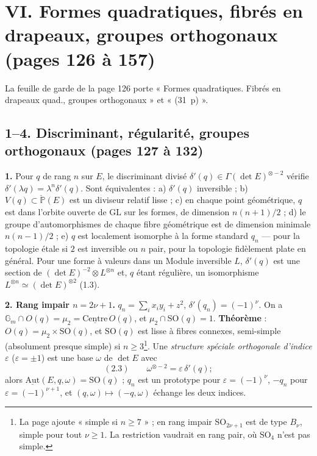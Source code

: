 \documentclass[11pt,a4paper]{article}
\begin{document}
\section*{VI. Formes quadratiques, fibrés en drapeaux, groupes orthogonaux (pages 126 à 157)}

La feuille de garde de la page 126 porte « Formes quadratiques. Fibrés en drapeaux
quad., groupes orthogonaux » et « (31~p) ».

\subsection*{1--4. Discriminant, régularité, groupes orthogonaux (pages 127 à 132)}

\textbf{1.} Pour $q$ de rang $n$ sur $E$, le discriminant divisé $\delta'(q) \in
\Gamma(\det E)^{\otimes -2}$ vérifie $\delta'(\lambda q) = \lambda^n\delta'(q)$. Sont
équivalentes : a) $\delta'(q)$ inversible ; b) $V(q) \subset \check{\mathbb{P}}(E)$ est
un diviseur relatif lisse ; c) en chaque point géométrique, $q$ est dans l'orbite
ouverte de $\mathrm{GL}$ sur les formes, de dimension $n(n+1)/2$ ; d) le groupe
d'automorphismes de chaque fibre géométrique est de dimension minimale $n(n-1)/2$ ;
e) $q$ est localement isomorphe à la forme standard $q_n$ — pour la topologie
étale si $2$ est inversible ou $n$ pair, pour la topologie fidèlement plate en
général. Pour une forme à valeurs dans un Module inversible $L$, $\delta'(q)$ est une
section de $(\det E)^{-2} \otimes L^{\otimes n}$ et, $q$ étant régulière, un
isomorphisme $L^{\otimes n} \simeq (\det E)^{\otimes 2}$ (1.3).

\textbf{2. Rang impair $n = 2\nu + 1$.} $q_n = \sum_{i} x_iy_i + z^2$,
$\delta'(q_n) = (-1)^\nu$. On a $\mathbb{G}_m \cap O(q) = \mu_2 =
\underline{\mathrm{Centre}}\,O(q)$, et $\mu_2 \cap \mathrm{SO}(q) = 1$.
\textbf{Théorème} : $O(q) = \mu_2 \times \mathrm{SO}(q)$, et $\mathrm{SO}(q)$ est lisse à
fibres connexes, semi-simple (absolument presque simple) si $n \geq 3$\footnote{La
page ajoute « simple si $n \geq 7$ » ; en rang impair $\mathrm{SO}_{2\nu+1}$ est de type
$B_\nu$, simple pour tout $\nu \geq 1$. La restriction vaudrait en rang pair, où
$\mathrm{SO}_4$ n'est pas simple.}. Une \emph{structure spéciale orthogonale d'indice
$\varepsilon$} ($\varepsilon = \pm 1$) est une base $\omega$ de $\det E$ avec
\[
  (2.3) \qquad \omega^{\otimes -2} = \varepsilon\,\delta'(q) ;
\]
alors $\underline{\mathrm{Aut}}(E, q, \omega) = \mathrm{SO}(q)$ ; $q_n$ est un prototype
pour $\varepsilon = (-1)^\nu$, $-q_n$ pour $\varepsilon = (-1)^{\nu+1}$, et $(q, \omega)
\mapsto (-q, \omega)$ échange les deux indices.
\end{document}
